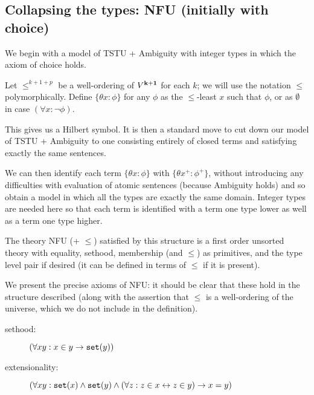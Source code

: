 \documentclass[12pt]{article}
\begin{document}
\subsection{Collapsing the types:  NFU (initially with choice)}

We begin with a model of TSTU + Ambiguity with integer types in which the axiom of choice holds.

Let $\leq^{k+1+p}$ be a well-ordering of $V^{\bf k+1}$ for each $k$;  we will use the notation $\leq$ polymorphically.  Define $\{\theta x:\phi\}$ for any $\phi$ as the $\leq$-least $x$ such that $\phi$, or as $\emptyset$ in case
$(\forall x:\neg \phi)$.

This gives us a Hilbert symbol.  It is then a standard move to cut down our model of TSTU + Ambiguity to one consisting entirely of closed terms and satisfying exactly the same sentences.

We can then identify each term $\{\theta x:\phi\}$ with $\{\theta x^+:\phi^+\}$, without introducing any difficulties with evaluation of atomic sentences (because Ambiguity holds) and so obtain a model in which
all the types are exactly the same domain.  Integer types are needed here so that each term is identified with a term one type lower as well as a term one type higher.

The theory NFU (+ $\leq$) satisfied by this structure is a first order unsorted theory with equality, sethood, membership (and $\leq$) as primitives, and the type level pair if desired (it can be defined in terms of $\leq$ if it is present).

We present the precise axioms of NFU:  it should be clear that these hold in the structure described (along with the assertion that $\leq$ is a well-ordering of the universe, which we do not include in the definition).

\begin{description}

\item[sethood:]  $(\forall xy:x \in y \rightarrow {\tt set}(y))$

\item[extensionality:] $(\forall xy: {\tt set}(x) \wedge {\tt set}(y) \wedge(\forall z:z \in x \leftrightarrow z \in y) \rightarrow x=y)$

\end{description}
\end{document}
